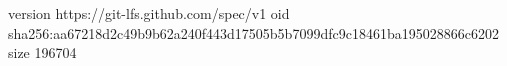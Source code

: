version https://git-lfs.github.com/spec/v1
oid sha256:aa67218d2c49b9b62a240f443d17505b5b7099dfc9c18461ba195028866c6202
size 196704
